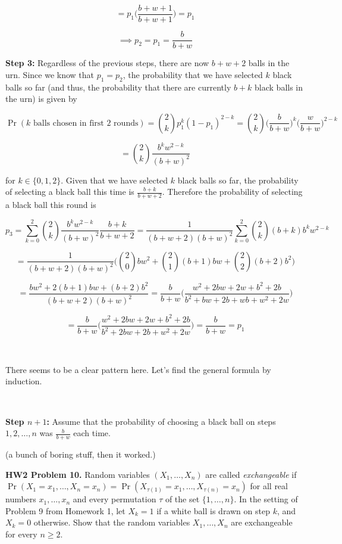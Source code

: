 \[
= p_1 \bigg(\frac{b + w + 1}{b + w + 1} \bigg) = p_1
\]



\[
\implies p_2 = p_1 =  \frac{b}{b+w}
\]

\textbf{Step 3:} Regardless of the previous steps, there are now \(b + w + 2\) balls in the urn. Since we know that \(p_1 = p_2\), the probability that we have selected \(k\) black balls so far (and thus, the probability that there are currently \(b + k\) black balls in the urn) is given by

\[
\Pr(k \text{ balls chosen in first 2 rounds}) = \binom{2}{k}p_1^k(1 - p_1)^{2 - k} = \binom{2}{k} \bigg(\frac{b}{b+w} \bigg)^k \bigg(\frac{w}{b+w} \bigg)^{2 - k}
\]

\[
= \binom{2}{k}\frac{b^k w^{2-k}}{(b+w)^2} 
\]

for \(k \in \{0, 1, 2\}\). Given that we have selected \(k\) black balls so far, the probability of selecting a black ball this time is \(\frac{b + k}{b + w + 2}\). Therefore the probability of selecting a black ball this round is

\[
p_3 = \sum_{k=0}^2 \binom{2}{k}\frac{b^k w^{2-k}}{(b+w)^2} \frac{b + k}{b + w + 2} = \frac{1}{(b+w+2)(b+w)^2} \sum_{k=0}^2 \binom{2}{k} (b+k)b^kw^{2-k}
\]

\[
= \frac{1}{(b+w+2)(b+w)^2} \bigg( \binom{2}{0}bw^2 + \binom{2}{1}(b+1)bw + \binom{2}{2}(b+2)b^2 \bigg)
\]

\[
= \frac{bw^2 + 2(b+1)bw + (b+2)b^2}{(b+w+2)(b+w)^2} = \frac{b}{b+w} \bigg(\frac{w^2 + 2bw + 2w + b^2 + 2b}{b^2 + bw + 2b + wb + w^2 + 2w}\bigg)
\]

\[
=\frac{b}{b+w} \bigg( \frac{w^2 + 2bw + 2w + b^2 + 2b}{b^2 + 2bw + 2b + w^2 + 2w} \bigg) = \frac{b}{b+w} = p_1
\]

\

There seems to be a clear pattern here. Let's find the general formula by induction.

\

\textbf{Step \(n + 1\):} Assume that the probability of choosing a black ball on steps \(1, 2, \dots, n\) was \( \frac{b}{b+w}\) each time.

(a bunch of boring stuff, then it worked.)

\textbf{HW2 Problem 10.} Random variables \((X_1, \ldots, X_n)\) are called \textit{exchangeable} if \(\Pr(X_1 = x_1, \ldots, X_n = x_n) = \Pr(X_{\tau(1)} = x_1, \ldots, X_{\tau(n)} = x_n) \) for all real numbers \(x_1, \ldots, x_n\) and every permutation \(\tau\) of the set \(\{1, \ldots, n\}\). In the setting of Problem 9 from Homework 1, let \(X_k = 1\) if a white ball is drawn on step \(k\), and \(X_k =0\) otherwise. Show that the random variables \(X_1, \ldots, X_n\) are exchangeable for every \(n \geq 2\).

